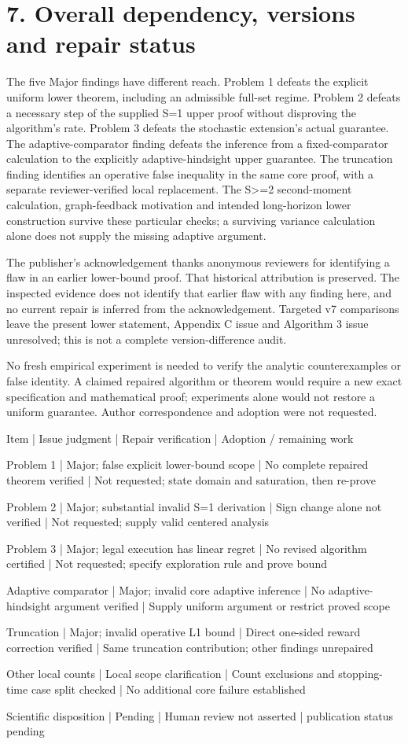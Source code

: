 \documentclass[10pt]{article}
\begin{document}
\section*{7. Overall dependency, versions and repair status}
The five Major findings have different reach. Problem 1 defeats the explicit uniform lower theorem, including an admissible full-set regime. Problem 2 defeats a necessary step of the supplied S=1 upper proof without disproving the algorithm’s rate. Problem 3 defeats the stochastic extension’s actual guarantee. The adaptive-comparator finding defeats the inference from a fixed-comparator calculation to the explicitly adaptive-hindsight upper guarantee. The truncation finding identifies an operative false inequality in the same core proof, with a separate reviewer-verified local replacement. The S>=2 second-moment calculation, graph-feedback motivation and intended long-horizon lower construction survive these particular checks; a surviving variance calculation alone does not supply the missing adaptive argument.\par
The publisher’s acknowledgement thanks anonymous reviewers for identifying a flaw in an earlier lower-bound proof. That historical attribution is preserved. The inspected evidence does not identify that earlier flaw with any finding here, and no current repair is inferred from the acknowledgement. Targeted v7 comparisons leave the present lower statement, Appendix C issue and Algorithm 3 issue unresolved; this is not a complete version-difference audit.\par
No fresh empirical experiment is needed to verify the analytic counterexamples or false identity. A claimed repaired algorithm or theorem would require a new exact specification and mathematical proof; experiments alone would not restore a uniform guarantee. Author correspondence and adoption were not requested.\par
Item | Issue judgment | Repair verification | Adoption / remaining work\par
Problem 1 | Major; false explicit lower-bound scope | No complete repaired theorem verified | Not requested; state domain and saturation, then re-prove\par
Problem 2 | Major; substantial invalid S=1 derivation | Sign change alone not verified | Not requested; supply valid centered analysis\par
Problem 3 | Major; legal execution has linear regret | No revised algorithm certified | Not requested; specify exploration rule and prove bound\par
Adaptive comparator | Major; invalid core adaptive inference | No adaptive-hindsight argument verified | Supply uniform argument or restrict proved scope\par
Truncation | Major; invalid operative L1 bound | Direct one-sided reward correction verified | Same truncation contribution; other findings unrepaired\par
Other local counts | Local scope clarification | Count exclusions and stopping-time case split checked | No additional core failure established\par
Scientific disposition | Pending | Human review not asserted | publication status pending\par
\end{document}
